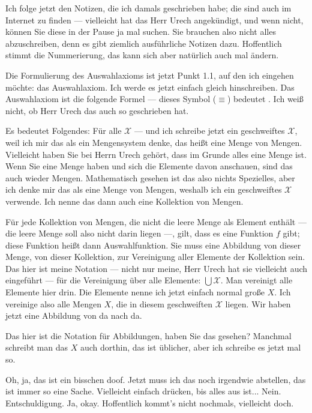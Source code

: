 \begin{spoken-clean}[00:12:15 - 00:14:40]
Ich folge jetzt den Notizen, die ich damals geschrieben habe; die sind auch im Internet zu finden --- vielleicht hat das Herr Urech angekündigt, und wenn nicht, können Sie diese in der Pause ja mal suchen. Sie brauchen also nicht alles abzuschreiben, denn es gibt ziemlich ausführliche Notizen dazu. Hoffentlich stimmt die Nummerierung, das kann sich aber natürlich auch mal ändern.

Die Formulierung des Auswahlaxioms ist jetzt Punkt 1.1, auf den ich eingehen möchte: das Auswahlaxiom. Ich werde es jetzt einfach gleich hinschreiben. Das Auswahlaxiom ist die folgende Formel --- dieses Symbol ($\equiv$) bedeutet . Ich weiß nicht, ob Herr Urech das auch so geschrieben hat.

Es bedeutet Folgendes: Für alle $\mathcal{X}$ --- und ich schreibe jetzt ein geschweiftes $\mathcal{X}$, weil ich mir das als ein Mengensystem denke, das heißt eine Menge von Mengen. Vielleicht haben Sie bei Herrn Urech gehört, dass im Grunde alles eine Menge ist. Wenn Sie eine Menge haben und sich die Elemente davon anschauen, sind das auch wieder Mengen. Mathematisch gesehen ist das also nichts Spezielles, aber ich denke mir das als eine Menge von Mengen, weshalb ich ein geschweiftes $\mathcal{X}$ verwende. Ich nenne das dann auch eine Kollektion von Mengen.

Für jede Kollektion von Mengen, die nicht die leere Menge als Element enthält --- die leere Menge soll also nicht darin liegen ---, gilt, dass es eine Funktion $f$ gibt; diese Funktion heißt dann Auswahlfunktion. Sie muss eine Abbildung von dieser Menge, von dieser Kollektion, zur Vereinigung aller Elemente der Kollektion sein. Das hier ist meine Notation --- nicht nur meine, Herr Urech hat sie vielleicht auch eingeführt --- für die Vereinigung über alle Elemente: $\bigcup \mathcal{X}$. Man vereinigt alle Elemente hier drin. Die Elemente nenne ich jetzt einfach normal große $X$. Ich vereinige also alle Mengen $X$, die in diesem geschweiften $\mathcal{X}$ liegen. Wir haben jetzt eine Abbildung von da nach da.

Das hier ist die Notation für Abbildungen, haben Sie das gesehen? Manchmal schreibt man das $X$ auch dorthin, das ist üblicher, aber ich schreibe es jetzt mal so.

Oh, ja, das ist ein bisschen doof. Jetzt muss ich das noch irgendwie abstellen, das ist immer so eine Sache. Vielleicht einfach drücken, bis alles aus ist... Nein. Entschuldigung. Ja, okay. Hoffentlich kommt's nicht nochmals, vielleicht doch.

\end{spoken-clean}

